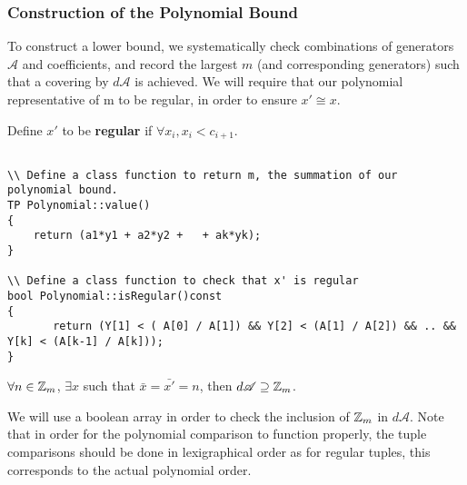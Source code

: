 \subsubsection{Construction of the Polynomial Bound}

To construct a lower bound, we systematically check combinations of generators $\mathscr{A}$ and coefficients, and record the largest $m$ (and corresponding generators) such that a covering by $d \mathscr{A}$ is achieved.\n
We will require that our polynomial representative of m to be regular, in order to ensure $x' \cong x$.

\begin{proposition}
Define $x'$ to be \textbf{regular} if $\forall x_i, x_i < c_{i+1}$.  
\end{proposition}

\begin{lstlisting}

\\ Define a class function to return m, the summation of our polynomial bound.
TP Polynomial::value()
{
    return (a1*y1 + a2*y2 +   + ak*yk);
}

\\ Define a class function to check that x' is regular
bool Polynomial::isRegular()const
{
       return (Y[1] < ( A[0] / A[1]) && Y[2] < (A[1] / A[2]) && .. && Y[k] < (A[k-1] / A[k]));
}

\end{lstlisting}

\begin{proposition}
$\forall n \in \mbox{$\mathbb Z$}_m$, $\exists  x$ such that $\bar{x} = \bar{x'}= n$, then $d \mathscr{A} \supseteq \mbox{$\mathbb Z$}_m$.\n
\end{proposition}

\noindent
We will use a boolean array in order to check the inclusion of $\mbox{$\mathbb Z$}_m$ in $d \mathscr{A}$. Note that in order for the polynomial comparison to function properly, the tuple comparisons should be done in lexigraphical order as for regular tuples, this corresponds to the actual polynomial order.

